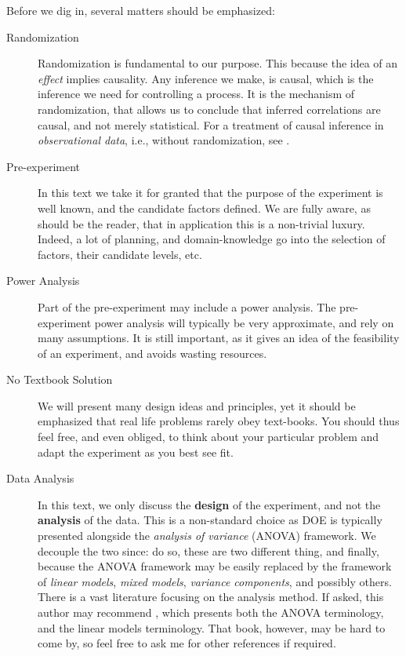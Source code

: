 Before we dig in, several matters should be emphasized:
\begin{description}
\item [Randomization] Randomization is fundamental to our purpose. This because the idea of an \emph{effect} implies causality. Any inference we make, is causal, which is the inference we need for controlling a process.
It is the mechanism of randomization, that allows us to conclude that inferred correlations are causal, and not merely statistical.
For a treatment of causal inference in \emph{observational data}, i.e., without randomization, see \cite{rosenbaum_observational_2002}.

\item [Pre-experiment] In this text we take it for granted that the purpose of the experiment is well known, and the candidate factors defined. We are fully aware, as should be the reader, that in application this is a non-trivial luxury. Indeed, a lot of planning, and domain-knowledge go into the selection of factors, their candidate levels, etc.

\item [Power Analysis] Part of the pre-experiment may include a power analysis. The pre-experiment power analysis will typically be very approximate, and rely on many assumptions. It is still important, as it gives an idea of the feasibility of an experiment, and avoids wasting resources.

\item [No Textbook Solution] We will present many design ideas and principles, yet it should be emphasized that real life problems rarely obey text-books. You should thus feel free, and even obliged, to think about your particular problem and adapt the experiment as you best see fit. 

\item[Data Analysis]
In this text, we only discuss the \textbf{design} of the experiment, and not the \textbf{analysis} of the data.
This is a non-standard choice as DOE is typically presented alongside the \emph{analysis of variance} (ANOVA) framework.
We decouple the two since: 
\cite{cox_theory_2000} do so, 
these are two different thing, and finally, because the ANOVA framework may be easily replaced by the framework of \emph{linear models}, \emph{mixed models}, \emph{variance components}, and possibly others. 
There is a vast literature focusing on the analysis method. 
If asked, this author may recommend \cite{hocking_analysis_1985}, which presents both the ANOVA terminology, and the linear models terminology.
That book, however, may be hard to come by, so feel free to ask me for other references if required.

\end{description}








